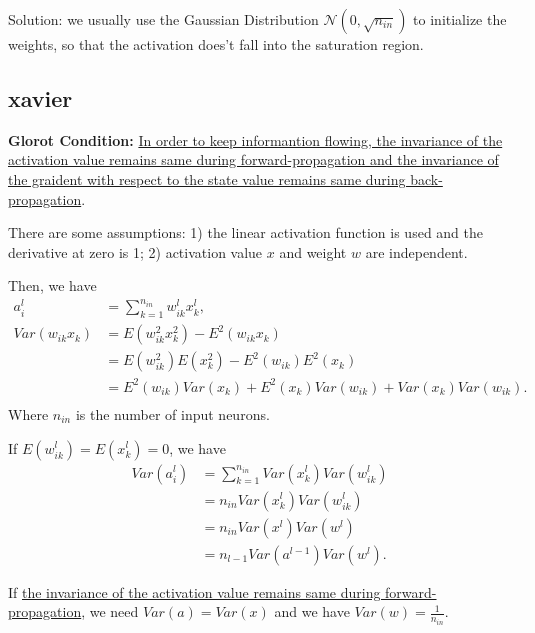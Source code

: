 \documentclass[10pt,onecolumn]{book}
\begin{document}
Solution: we usually use the Gaussian Distribution $\mathcal{N}(0, \sqrt{n_{in}})$ to initialize the weights, so that the activation does't fall into the saturation region.

\subsection{xavier}
\textbf{Glorot Condition: }\uline{In order to keep informantion flowing, the invariance of the activation value remains same during forward-propagation and the invariance of the graident with respect to the state value remains same during back-propagation}.

There are some assumptions:
1) the linear activation function is used and the derivative at zero is 1;
2) activation value $x$ and weight $w$ are independent.

Then, we have
\begin{equation}
\begin{split}
a^l_i &= \sum_{k=1}^{n_{in}} w^l_{ik} x^l_{k}, \\
Var(w_{ik} x_k) &= E(w_{ik}^2 x_k^2) - E^2(w_{ik} x_{k}) \\
			&= E(w_{ik}^2) E(x_{k}^2) - E^2(w_{ik})E^2(x_{k}) \\
			&= E^2(w_{ik})Var(x_{k}) + E^2(x_k)Var(w_{ik}) + Var(x_k)Var(w_{ik}). \\ 
\end{split}
\end{equation}
Where $n_{in}$ is the number of input neurons.

If $E(w^l_{ik}) = E(x^l_{k}) = 0$, we have
\begin{equation}\label{eq:xavier_fp}
\begin{split}
Var(a^l_i) &= \sum_{k = 1}^{n_{in}} Var(x^l_{k})Var(w^l_{ik}) \\
		&= {n_{in}} Var(x^l_k) Var(w^l_{ik}) \\
		&= n_{in}Var(x^l) Var(w^l) \\
		&= n_{l - 1} Var(a^{l - 1}) Var(w^l).
\end{split}
\end{equation}

If \uline{the invariance of the activation value remains same during forward-propagation}, we need $Var(a) = Var(x)$ and we have $Var(w) = \frac{1}{n_{in}}$.
\end{document}
